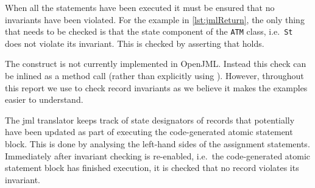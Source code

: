 When all the statements have been executed it must be ensured that no
invariants have been violated. For the example in
\autoref{lst:jmlReturn}, the only thing that needs to be checked is
that the state component of the \texttt{ATM} class, i.e.\ \texttt{St}
does not violate its invariant. This is checked by asserting that
 holds.


%
%

The \invariantfor construct is not currently implemented in
OpenJML. Instead this check can be inlined as
a method call (rather than explicitly using \invariantfor). However,
throughout this report we use \invariantfor to check record invariants
as we believe it makes the examples easier to understand.

The \ac{jml} translator keeps track of state designators of records
that potentially have been updated as part of executing the
code-generated atomic statement block. This is done by analysing the
left-hand sides of the assignment statements. Immediately after
invariant checking is re-enabled, i.e.\ the code-generated atomic
statement block has finished execution, it is checked that no record
violates its invariant.

